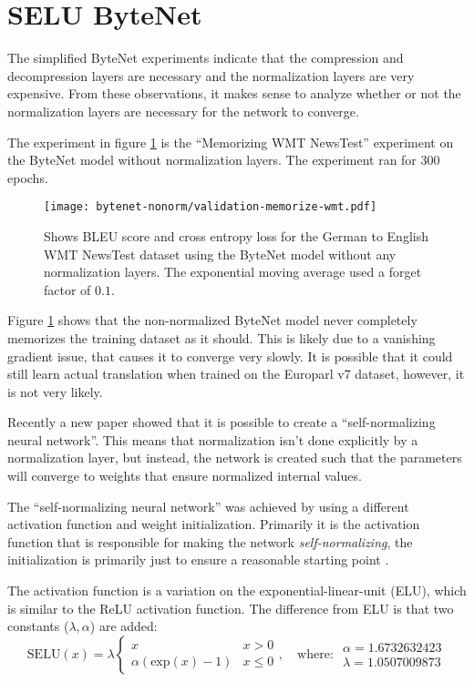 \section{SELU ByteNet}

The simplified ByteNet experiments indicate that the compression and decompression layers are necessary and the normalization layers are very expensive. From these observations, it makes sense to analyze whether or not the normalization layers are necessary for the network to converge.

The experiment in figure \ref{fig:result:selu-bytenet:bytenet-nonorm-wmt} is the ``Memorizing WMT NewsTest'' experiment on the ByteNet model without normalization layers. The experiment ran for 300 epochs.

\begin{figure}[h]
    \centering
    \texttt{[image: bytenet-nonorm/validation-memorize-wmt.pdf]}
    \caption{Shows BLEU score and cross entropy loss for the German to English WMT NewsTest dataset using the ByteNet model without any normalization layers. The exponential moving average used a forget factor of $0.1$.}
    \label{fig:result:selu-bytenet:bytenet-nonorm-wmt}
\end{figure}

Figure \ref{fig:result:selu-bytenet:bytenet-nonorm-wmt} shows that the non-normalized ByteNet model never completely memorizes the training dataset as it should. This is likely due to a vanishing gradient issue, that causes it to converge very slowly. It is possible that it could still learn actual translation when trained on the Europarl v7 dataset, however, it is not very likely.

Recently a new paper showed that it is possible to create a ``self-normalizing neural network''. This means that normalization isn't done explicitly by a normalization layer, but instead, the network is created such that the parameters will converge to weights that ensure normalized internal values.

The ``self-normalizing neural network'' was achieved by using a different activation function and weight initialization. Primarily it is the activation function that is responsible for making the network \textit{self-normalizing}, the initialization is primarily just to ensure a reasonable starting point \cite{selu}.

The activation function is a variation on the exponential-linear-unit (ELU), which is similar to the ReLU activation function. The difference from ELU is that two constants ($\lambda, \alpha$) are added:
\begin{equation}
\mathrm{SELU}(x) = \lambda \begin{cases}
  x & x > 0 \\
  \alpha (\mathrm{exp}(x) - 1) & x \le 0
\end{cases},\quad \text{where: } \begin{array}{c}
  \alpha = 1.6732632423 \\
  \lambda = 1.0507009873
\end{array}
\end{equation}

